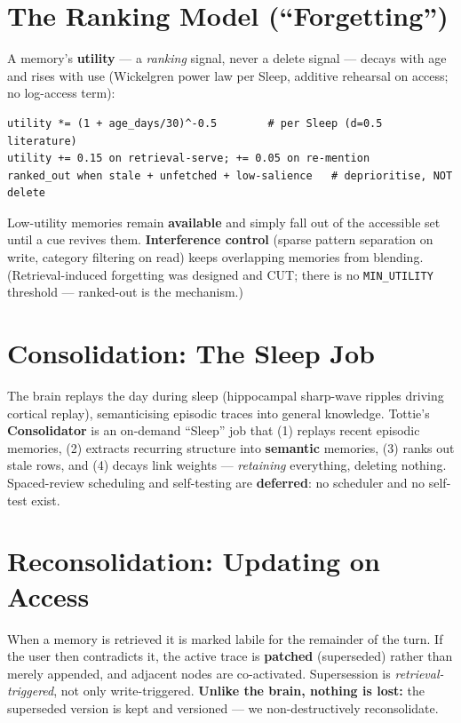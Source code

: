 \section{The Ranking Model (``Forgetting'')}
A memory's \textbf{utility} --- a \emph{ranking} signal, never a delete signal --- decays with age and
rises with use (Wickelgren power law per Sleep, additive rehearsal on access; no log-access term):
\begin{Verbatim}[breaklines=true,fontsize=\small]
utility *= (1 + age_days/30)^-0.5        # per Sleep (d=0.5 literature)
utility += 0.15 on retrieval-serve; += 0.05 on re-mention
ranked_out when stale + unfetched + low-salience   # deprioritise, NOT delete
\end{Verbatim}
Low-utility memories remain \textbf{available} and simply fall out of the accessible set until a cue
revives them. \textbf{Interference control} (sparse pattern separation on write, category filtering on
read) keeps overlapping memories from blending. (Retrieval-induced forgetting was designed and CUT;
there is no \texttt{MIN\_UTILITY} threshold --- ranked-out is the mechanism.)

\section{Consolidation: The Sleep Job}
The brain replays the day during sleep (hippocampal sharp-wave ripples driving cortical replay),
semanticising episodic traces into general knowledge. Tottie's \textbf{Consolidator} is an on-demand
``Sleep'' job that (1) replays recent episodic memories, (2) extracts recurring structure into
\textbf{semantic} memories, (3) ranks out stale rows, and (4) decays link weights --- \emph{retaining}
everything, deleting nothing. Spaced-review scheduling and self-testing are \textbf{deferred}: no
scheduler and no self-test exist.

\section{Reconsolidation: Updating on Access}
When a memory is retrieved it is marked labile for the remainder of the turn. If the user then
contradicts it, the active trace is \textbf{patched} (superseded) rather than merely appended, and
adjacent nodes are co-activated. Supersession is \emph{retrieval-triggered}, not only write-triggered.
\textbf{Unlike the brain, nothing is lost:} the superseded version is kept and versioned --- we
non-destructively reconsolidate.

